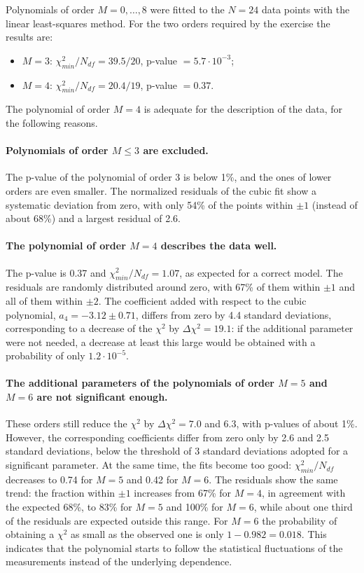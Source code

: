 \documentclass[11pt,a4paper]{article}
\begin{document}
	Polynomials of order $M = 0, \dots, 8$ were fitted to the $N = 24$ data points with the linear least-squares method.
	For the two orders required by the exercise the results are:
	\begin{itemize}
		\item $M = 3$: $\chi^2_{min}/N_{df} = 39.5/20$, p-value $= 5.7 \cdot 10^{-3}$;
		\item $M = 4$: $\chi^2_{min}/N_{df} = 20.4/19$, p-value $= 0.37$.
	\end{itemize}
	The polynomial of order $M = 4$ is adequate for the description of the data, for the following reasons.

	\paragraph{Polynomials of order $M \leq 3$ are excluded.}
	The p-value of the polynomial of order 3 is below 1\%, and the ones of lower orders are even smaller.
	The normalized residuals of the cubic fit show a systematic deviation from zero, with only 54\% of the points within $\pm 1$ (instead of about 68\%) and a largest residual of 2.6.

	\paragraph{The polynomial of order $M = 4$ describes the data well.}
	The p-value is 0.37 and $\chi^2_{min}/N_{df} = 1.07$, as expected for a correct model.
	The residuals are randomly distributed around zero, with 67\% of them within $\pm 1$ and all of them within $\pm 2$.
	The coefficient added with respect to the cubic polynomial, $a_4 = -3.12 \pm 0.71$, differs from zero by 4.4 standard deviations, corresponding to a decrease of the $\chi^2$ by $\Delta\chi^2 = 19.1$: if the additional parameter were not needed, a decrease at least this large would be obtained with a probability of only $1.2 \cdot 10^{-5}$.

	\paragraph{The additional parameters of the polynomials of order $M = 5$ and $M = 6$ are not significant enough.}
	These orders still reduce the $\chi^2$ by $\Delta\chi^2 = 7.0$ and $6.3$, with p-values of about 1\%.
	However, the corresponding coefficients differ from zero only by 2.6 and 2.5 standard deviations, below the threshold of 3 standard deviations adopted for a significant parameter.
	At the same time, the fits become too good: $\chi^2_{min}/N_{df}$ decreases to 0.74 for $M = 5$ and 0.42 for $M = 6$.
	The residuals show the same trend: the fraction within $\pm 1$ increases from 67\% for $M = 4$, in agreement with the expected 68\%, to 83\% for $M = 5$ and 100\% for $M = 6$, while about one third of the residuals are expected outside this range.
	For $M = 6$ the probability of obtaining a $\chi^2$ as small as the observed one is only $1 - 0.982 = 0.018$.
	This indicates that the polynomial starts to follow the statistical fluctuations of the measurements instead of the underlying dependence.
\end{document}

